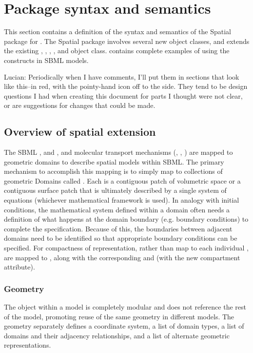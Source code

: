 
\section{Package syntax and semantics}
\label{sec:syntax}
This section contains a definition of the syntax and semantics of the Spatial package for \sbmlthreecore.  The Spatial package involves several new object classes, and extends the existing \Model, \Compartment, \Species, \Reaction, and \Parameter object class.   contains complete examples of using the constructs in SBML models.

{\color{red} Lucian: \notice Periodically when I have comments, I'll put them in sections that look like this--in red, with the pointy-hand icon off to the side.  They tend to be design questions I had when creating this document for parts I thought were not clear, or are suggestions for changes that could be made.}


\subsection{Overview of spatial extension}
The SBML \Compartment, \Reaction and \Species, and molecular transport mechanisms (\DiffusionCoefficient, \AdvectionCoefficient, \BoundaryCondition) are mapped to geometric domains to describe spatial models within SBML.  The primary mechanism to accomplish this mapping is to simply map \Compartments to collections of geometric Domains called \DomainTypes.  Each \Domain is a contiguous patch of volumetric space or a contiguous surface patch that is ultimately described by a single system of equations (whichever mathematical framework is used).  In analogy with initial conditions, the mathematical system defined within a domain often needs a definition of what happens at the domain boundary (e.g. boundary conditions) to complete the specification.  Because of this, the boundaries between adjacent domains need to be identified so that appropriate boundary conditions can be specified.  For compactness of representation, rather than map to each individual \Domain, \Compartments are mapped to \DomainTypes, along with the corresponding \Species and \Reactions (with the new compartment attribute).

\subsubsection{Geometry}
The \Geometry object within a model is completely modular and does not reference the rest of the model, promoting reuse of the same geometry in different models.  The geometry separately defines a coordinate system, a list of domain types, a list of domains and their adjacency relationships, and a list of alternate geometric representations.

